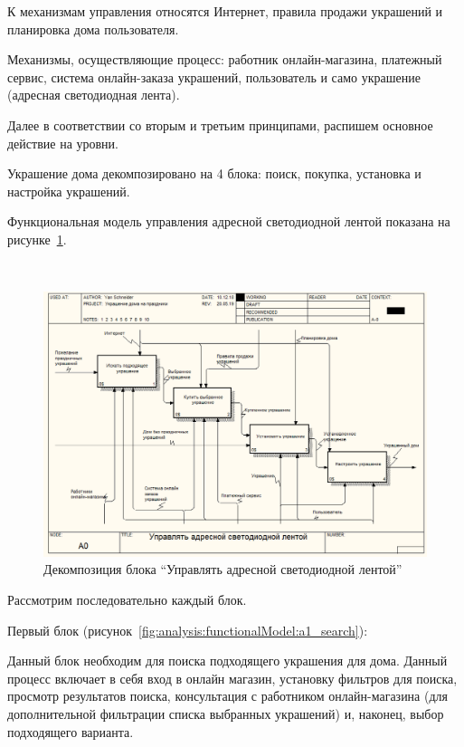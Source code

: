 К механизмам управления относятся Интернет, правила продажи украшений и планировка дома пользователя.

Механизмы, осуществляющие процесс: работник онлайн-магазина, платежный сервис, система онлайн-заказа украшений, пользователь и само украшение (адресная светодиодная лента).

Далее в соответствии со вторым и третьим принципами, распишем основное действие на уровни.

Украшение дома декомпозировано на 4 блока: поиск, покупка, установка и настройка украшений.

Функциональная модель управления адресной светодиодной лентой показана на рисунке~\ref{fig:analysis:functionalModel:a0_decoration}.

~
\begin{figure}[H]
\centering
	\includegraphics[scale=0.45]{figures/functionalModel/a0_decoration.png}
	\caption{Декомпозиция блока \enquote{Управлять адресной светодиодной лентой}}
	\label{fig:analysis:functionalModel:a0_decoration}
\end{figure}

Рассмотрим последовательно каждый блок.

Первый блок (рисунок~\ref{fig:analysis:functionalModel:a1_search}):

Данный блок необходим для поиска подходящего украшения для дома. Данный процесс включает в себя вход в онлайн магазин, установку фильтров для поиска, просмотр результатов поиска, консультация с работником онлайн-магазина (для дополнительной фильтрации списка выбранных украшений) и, наконец, выбор подходящего варианта.

